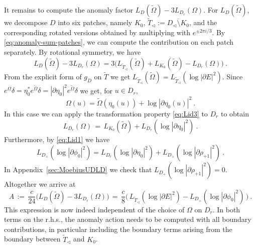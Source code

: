 \documentclass[11pt,a4paper]{article}
\numberwithin{equation}{section}
\begin{document}
It remains to compute the anomaly factor $L_D(\tilde\Omega) - 3 L_{D_r}(\Omega)$. For $L_D(\tilde\Omega)$, we decompose $D$ into six patches, namely $K_0$, $\widetilde T_\triangleleft := \overline{D_\triangleleft \setminus K_0}$, and the corresponding rotated versions obtained by multiplying with $e^{ \pm 2 \pi i /3}$. By \eqref{eq:anomaly-sum-patches}, we can compute the contribution on each patch separately. By rotational symmetry, we have
\begin{equation}
    L_D(\tilde\Omega) - 3 L_{D_r}(\Omega)
    =
    3 \big(  L_{\widetilde T_\triangleleft}(\tilde\Omega) + L_{K_0}(\tilde\Omega) - L_{D_r}(\Omega) \big) \ .
\end{equation}
From the explicit form of $g_D$ on $\widetilde T$ we get
$L_{\widetilde T_\triangleleft}(\tilde\Omega) = L_{\widetilde T_\triangleleft}(\log |\partial E|^2)$. 
Since $e^\Omega \delta = \eta_0^* e^{\tilde\Omega} \delta = |\partial \eta_0|^2 e^{\tilde\Omega} \delta$ we get, for $u \in D_r$,
%
\begin{equation}
    \Omega(u)
    =
    \tilde\Omega(\eta_0(u)) 
    + 
    \log |\partial \eta_0(u)|^2 
    \ .
\end{equation}
%
In this case we can apply the transformation property \eqref{eq:Lid3} to $D_r$ to obtain
%
\begin{equation}
    L_{D_r}(\Omega) \,=\,
    L_{K_0}(\tilde\Omega) + L_{D_r}(\log |\partial \eta_0|^2) \ .
\end{equation}
%
Furthermore, by \eqref{eq:Lid1} we have
%
\begin{equation}
        L_{D_+}(\log |\partial \phi_0|^2) = L_{D_r}(\log |\partial \eta_0|^2) + L_{D_+}(\log |\partial \rho_{+1}|^2)\ .
\end{equation}
%
In Appendix~\ref{sec:MoebiusUDLD} we check that $L_{D_+}(\log |\partial \rho_{+1}|^2)=0$. 
Altogether we arrive at
%
\begin{equation}\label{eq:triangle-anomaly-factor}
    A \,:=\, \frac{c}{24}\Big( L_D(\tilde\Omega) - 3 L_{D_r}(\Omega) \Big)
    \,=\,
    \frac{c}{8}\Big(
    \, L_{\widetilde T_\triangleleft}(\log |\partial E|^2) - L_{D_+}(\log |\partial \phi_0|^2) \, \Big) \ .
\end{equation}
%
This expression is now indeed independent of the choice of $\Omega$ on $D_r$. In both terms on the r.h.s., the anomaly action needs to be computed with all boundary contributions, in particular including the boundary terms arising from the boundary between $\widetilde T_\triangleleft$ and $K_0$. 
\end{document}
